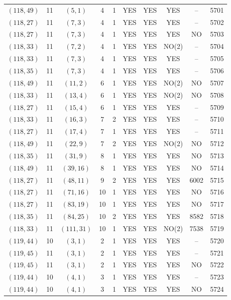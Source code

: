 \begin{longtable}{|c|c|c|c|c|c|c|c|c|c|}
$(118, 49)$ & 11 & $(5, 1)$ & 4 & 1 & YES & YES & YES & -- & 5701\\
$(118, 27)$ & 11 & $(7, 3)$ & 4 & 1 & YES & YES & YES & -- & 5702\\
$(118, 27)$ & 11 & $(7, 3)$ & 4 & 1 & YES & YES & YES & NO & 5703\\
$(118, 33)$ & 11 & $(7, 2)$ & 4 & 1 & YES & YES & NO(2) & -- & 5704\\
$(118, 33)$ & 11 & $(7, 3)$ & 4 & 1 & YES & YES & YES & -- & 5705\\
$(118, 35)$ & 11 & $(7, 3)$ & 4 & 1 & YES & YES & YES & -- & 5706\\
$(118, 49)$ & 11 & $(11, 2)$ & 6 & 1 & YES & YES & NO(2) & NO & 5707\\
$(118, 33)$ & 11 & $(13, 4)$ & 6 & 1 & YES & YES & NO(2) & NO & 5708\\
$(118, 27)$ & 11 & $(15, 4)$ & 6 & 1 & YES & YES & YES & -- & 5709\\
$(118, 33)$ & 11 & $(16, 3)$ & 7 & 2 & YES & YES & YES & -- & 5710\\
$(118, 27)$ & 11 & $(17, 4)$ & 7 & 1 & YES & YES & YES & -- & 5711\\
$(118, 49)$ & 11 & $(22, 9)$ & 7 & 2 & YES & YES & NO(2) & NO & 5712\\
$(118, 35)$ & 11 & $(31, 9)$ & 8 & 1 & YES & YES & YES & NO & 5713\\
$(118, 49)$ & 11 & $(39, 16)$ & 8 & 1 & YES & YES & YES & NO & 5714\\
$(118, 27)$ & 11 & $(48, 11)$ & 9 & 2 & YES & YES & YES & 6002 & 5715\\
$(118, 27)$ & 11 & $(71, 16)$ & 10 & 1 & YES & YES & YES & NO & 5716\\
$(118, 27)$ & 11 & $(83, 19)$ & 10 & 1 & YES & YES & YES & NO & 5717\\
$(118, 35)$ & 11 & $(84, 25)$ & 10 & 2 & YES & YES & YES & 8582 & 5718\\
$(118, 33)$ & 11 & $(111, 31)$ & 10 & 1 & YES & YES & NO(2) & 7538 & 5719\\
$(119, 44)$ & 10 & $(3, 1)$ & 2 & 1 & YES & YES & YES & -- & 5720\\
$(119, 45)$ & 11 & $(3, 1)$ & 2 & 1 & YES & YES & YES & -- & 5721\\
$(119, 45)$ & 11 & $(3, 1)$ & 2 & 1 & YES & YES & YES & NO & 5722\\
$(119, 44)$ & 10 & $(4, 1)$ & 3 & 1 & YES & YES & YES & -- & 5723\\
$(119, 44)$ & 10 & $(4, 1)$ & 3 & 1 & YES & YES & YES & NO & 5724\\

\end{longtable}

